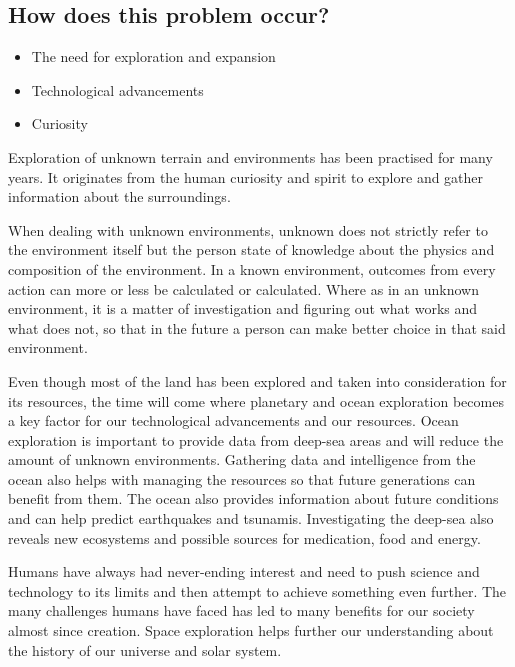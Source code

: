 \subsection{How does this problem occur?}
\begin{itemize}
	\item The need for exploration and expansion
	\item Technological advancements
	\item Curiosity
\end{itemize}

Exploration of unknown terrain and environments has been practised for many years. It originates from the human curiosity  and spirit to explore and gather information about the surroundings.

When dealing with unknown environments, unknown does not strictly refer to the environment itself but the person state of knowledge about the physics and composition of the environment. In a known environment, outcomes from every action can more or less be calculated or calculated. Where as in an unknown environment, it is a matter of investigation and figuring out what works and what does not, so that in the future a person can make better choice in that said environment.

Even though most of the land has been explored and taken into consideration for its resources, the time will come where planetary and ocean exploration becomes a key factor for our technological advancements and our resources. Ocean exploration is important to provide data from deep-sea areas and will reduce the amount of unknown environments.
Gathering data and intelligence from the ocean also helps with managing the resources so that future generations can benefit from them. The ocean also provides information about future conditions and can help predict earthquakes and tsunamis. Investigating the deep-sea also reveals new ecosystems and possible sources for medication, food and energy. 

Humans have always had never-ending interest and need to push science and technology to its limits and then attempt to achieve something even further.  The many challenges humans have faced has led to many benefits for our society almost since creation. Space exploration helps further our understanding about the history of our universe and solar system. 

